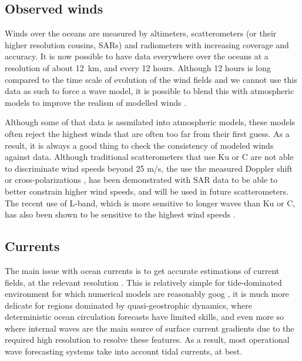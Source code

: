 
\subsection{Observed winds}
Winds over the oceans are measured by altimeters, scatterometers (or their higher resolution cousins, SARs) and radiometers with increasing 
coverage and accuracy. It is now possible to have data everywhere over the oceans at a resolution of about 12~km, and every 12 hours. 
Although 12 hours is long compared to the time scale of evolution of the wind fields and we cannot use this data as such to force a wave model, 
it is possible to blend this with atmospheric models to improve the realism of modelled winds \citep[e.g.][]{Bentamy&al.2007}. 

Although some of that data is assmilated into atmospheric models, these models often reject the highest winds that are often too far from their 
first guess. As a result, it is always a good thing to check the consistency of modeled winds against data. Although traditional scatterometers that use Ku or C 
are not able to discriminate wind speeds beyond 25 m/s, the use the measured Doppler shift \citep{Mouche&al.2012} or cross-polarizations \citep{Vachon&Wolfe2011,Mouche&Chapron2015}, 
has been demonstrated with SAR data to be able to better constrain higher wind speeds, and will be used in future scatterometers. The recent use of L-band, which is more 
sensitive to longer waves than Ku or C, has also been shown to be sensitive to the highest wind speeds \citep{Reul&al.2012}. 

\subsection{Currents}
The main issue with ocean currents is to get accurate estimations of current fields, at the relevant resolution \citep{Ardhuin&al.2017a}. This is relatively simple for tide-dominated environment 
for which numerical models are reasonably goog \citep[e.g.][]{Ardhuin&al.2012}, it is much more delicate for regions dominated by quasi-geostrophic dynamics, where 
deterministic ocean circulation forecasts have limited skills, 
and even more so where internal waves are the main source of surface current gradients \citep{Osborne&Burch1980} due to the required high resolution to resolve these 
features.  As a result, most operational wave forecasting systems take into account tidal currents, at best. 

